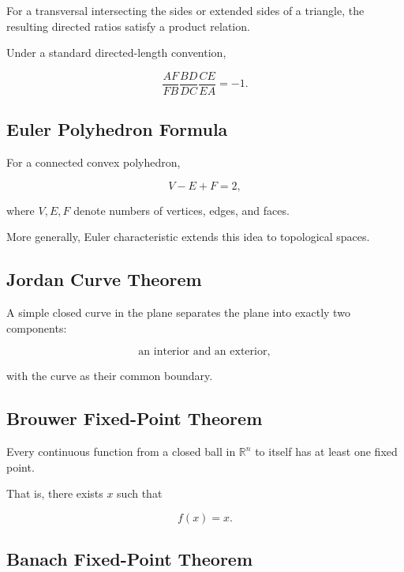 For a transversal intersecting the sides or extended sides of a triangle,
the resulting directed ratios satisfy a product relation.

Under a standard directed-length convention,

\[
\boxed{
\frac{AF}{FB}
\frac{BD}{DC}
\frac{CE}{EA}
=
-1.
}
\]

\subsection{Euler Polyhedron Formula}
\label{subsec:euler-polyhedron-summary}

For a connected convex polyhedron,

\[
\boxed{
V-E+F=2,
}
\]

where \(V,E,F\) denote numbers of vertices, edges, and faces.

More generally, Euler characteristic extends this idea to topological spaces.

\subsection{Jordan Curve Theorem}
\label{subsec:jordan-curve-summary}

A simple closed curve in the plane separates the plane into exactly two
components:

\[
\boxed{
\text{an interior and an exterior},
}
\]

with the curve as their common boundary.

\subsection{Brouwer Fixed-Point Theorem}
\label{subsec:brouwer-fixed-point-summary}

Every continuous function from a closed ball in \(\mathbb{R}^n\) to itself
has at least one fixed point.

That is, there exists \(x\) such that

\[
\boxed{
f(x)=x.
}
\]

\subsection{Banach Fixed-Point Theorem}
\label{subsec:banach-fixed-point-summary}

